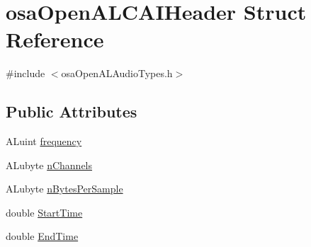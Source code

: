 \hypertarget{structosa_open_a_l_c_a_i_header}{\section{osa\-Open\-A\-L\-C\-A\-I\-Header Struct Reference}
\label{structosa_open_a_l_c_a_i_header}
}


{\ttfamily \#include $<$osa\-Open\-A\-L\-Audio\-Types.\-h$>$}

\subsection*{Public Attributes}
\begin{DoxyCompactItemize}
\item 
A\-Luint \hyperlink{structosa_open_a_l_c_a_i_header_aaa90f7109f9686b0b3d1cfe440bb244a}{frequency}
\item 
A\-Lubyte \hyperlink{structosa_open_a_l_c_a_i_header_a244fe6df719466694ffc1ccc593d54d0}{n\-Channels}
\item 
A\-Lubyte \hyperlink{structosa_open_a_l_c_a_i_header_a6856804bf471be06e7f3382088f0815f}{n\-Bytes\-Per\-Sample}
\item 
double \hyperlink{structosa_open_a_l_c_a_i_header_a997c67e3b4e503cd6a374bc26c4151d9}{Start\-Time}
\item 
double \hyperlink{structosa_open_a_l_c_a_i_header_a6b1dc8f15a496e97853553fe619e5708}{End\-Time}
\end{DoxyCompactItemize}


